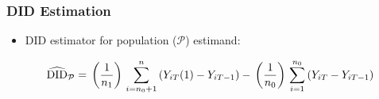 \documentclass[table, xcolor = {dvipsnames}, 9pt]{beamer}
\theoremstyle{plain}
\newcommand{\tikzmark}[1]{\tikz[baseline,remember picture] \coordinate (#1) {};}
\begin{document}
\begin{frame}[t]
\frametitle{DID Estimation}
\vfill
\begin{itemize}
\item DID estimator for population ($\mathcal{P}$) estimand: \pause \vfill
\normalsize
{\large
\begin{equation*}
\begin{split}
 \tikzmark{est}\widehat{\text{DID}}_{\mathcal{P}} & = \tikzmark{ntreat}\left(\frac{1}{n_1}\right)\tikzmark{treatsum}\sum_{i = n_0 + 1}^{n} \left(\tikzmark{treatedpotout}Y_{iT}(1) - \tikzmark{treatedout}Y_{iT-1}\right) - \tikzmark{ncontrol}\left(\frac{1}{n_0}\right)\tikzmark{controlsum}\sum_{i = 1}^{n_0} \left(\tikzmark{postcontrolout}Y_{iT} - \tikzmark{precontrolout}Y_{iT-1}\right)
\end{split} 
\end{equation*}
}
\end{itemize}
\end{frame}
\end{document}
